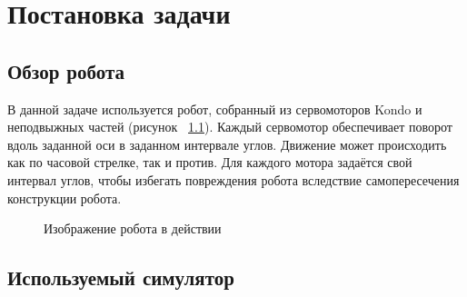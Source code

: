 \chapter{Постановка задачи}\label{ch:ch1}
\section{Обзор робота}\label{sec:ch1/sec1}
В данной задаче используется робот, собранный из сервомоторов Kondo и неподвыжных частей (рисунок ~\cref{fig:real_robot}). Каждый сервомотор обеспечивает поворот вдоль заданной оси в заданном интервале углов. Движение может происходить как по часовой стрелке, так и против. Для каждого мотора задаётся свой интервал углов, чтобы избегать повреждения робота вследствие самопересечения конструкции робота.

\begin{figure}[ht]
    \caption[Изображение робота в действии]{Изображение робота в действии}\label{fig:real_robot}
\end{figure}
\section{Используемый симулятор}\label{sec:ch1/sec1}
